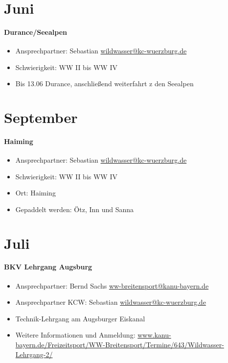 \documentclass[12pt, a4paper]{report}
\begin{document}
\section*{Juni}\paragraph{Durance/Seealpen}
\begin{itemize}
    \item Ansprechpartner: Sebastian \href{mailto:wildwasser@kc-wuerzburg.de}{wildwasser@kc-wuerzburg.de}
    \item Schwierigkeit: WW II bis WW IV
    \item Bis 13.06 Durance, anschließend weiterfahrt z den Seealpen
\end{itemize}

\section*{September}\paragraph{Haiming}
\begin{itemize}
    \item Ansprechpartner: Sebastian \href{mailto:wildwasser@kc-wuerzburg.de}{wildwasser@kc-wuerzburg.de}
    \item Schwierigkeit: WW II bis WW IV
    \item Ort: Haiming
    \item Gepaddelt werden: Ötz, Inn und Sanna
\end{itemize}

\section*{Juli}\paragraph{BKV Lehrgang Augsburg}
\begin{itemize}
    \item Ansprechpartner: Bernd Sachs \href{mailto:ww-breitensport@kanu-bayern.de}{ww-breitensport@kanu-bayern.de}
    \item Ansprechpartner KCW: Sebastian \href{mailto:wildwasser@kc-wuerzburg.de}{wildwasser@kc-wuerzburg.de}
    \item Technik-Lehrgang am Augsburger Eiskanal
    \item Weitere Informationen und Anmeldung: \url{www.kanu-bayern.de/Freizeitsport/WW-Breitensport/Termine/643/Wildwasser-Lehrgang-2/}
\end{itemize}
\end{document}

